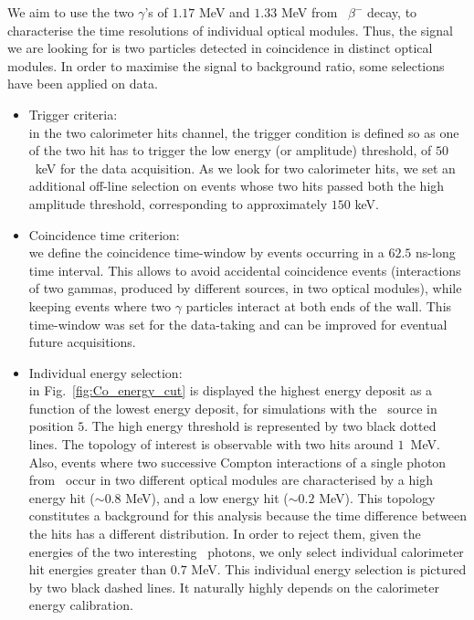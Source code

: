 We aim to use the two $\gamma$'s of $1.17$ MeV and $1.33$ MeV from \Co\ $\beta^{-}$ decay, to characterise the time resolutions of individual optical modules.
Thus, the signal we are looking for is two particles detected in coincidence in distinct optical modules.
In order to maximise the signal to background ratio, some selections have been applied on data.
\begin{itemize}
\item Trigger criteria:\\ in the two calorimeter hits channel, the trigger condition is defined so as one of the two hit has to trigger the low energy (or amplitude) threshold, of $50$~keV for the data acquisition.
  As we look for two calorimeter hits, we set an additional off-line selection on events whose two hits passed both the high amplitude threshold, corresponding to approximately $150$ keV.
\item Coincidence time criterion:\\ we define the coincidence time-window by events occurring in a $62.5$ ns-long time interval.
  This allows to avoid accidental coincidence events (interactions of two gammas, produced by different sources, in two optical modules), while keeping events where two $\gamma$ particles interact at both ends of the wall.
  This time-window was set for the data-taking and can be improved for eventual future acquisitions.
\item Individual energy selection:\\ in Fig.~\ref{fig:Co_energy_cut} is displayed the highest energy deposit as a function of the lowest energy deposit, for simulations with the \Co\ source in position $5$.
  The high energy threshold is represented by two black dotted lines.
  The topology of interest is observable with two hits around $1$~MeV.
  Also, events where two successive Compton interactions of a single photon from \Co\ occur in two different optical modules are characterised by a high energy hit ($\sim 0.8$ MeV), and a low energy hit ($\sim 0.2$ MeV).
  This topology constitutes a background for this analysis because the time difference between the hits has a different distribution.
  In order to reject them, given the energies of the two interesting \Co\ photons, we only select individual calorimeter hit energies greater than $0.7$ MeV.
  This individual energy selection is pictured by two black dashed lines.
  It naturally highly depends on the calorimeter energy calibration.

\end{itemize}
